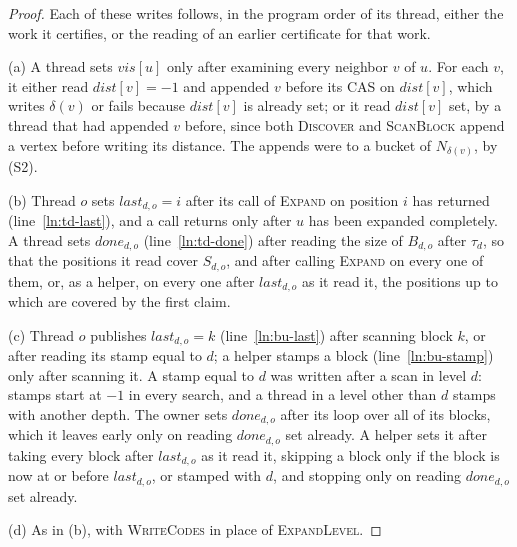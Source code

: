 \begin{proof}
Each of these writes follows, in the program order of its thread, either the work it certifies, or the reading of an earlier certificate for that work.

(a) A thread sets $\mathit{vis}[u]$ only after examining every neighbor $v$ of $u$. For each $v$, it either read $\mathit{dist}[v] = -1$ and appended $v$ before its CAS on $\mathit{dist}[v]$, which writes $\delta(v)$ or fails because $\mathit{dist}[v]$ is already set; or it read $\mathit{dist}[v]$ set, by a thread that had appended $v$ before, since both \textsc{Discover} and \textsc{ScanBlock} append a vertex before writing its distance. The appends were to a bucket of $N_{\delta(v)}$, by (S2).

(b) Thread $o$ sets $\mathit{last}_{d,o} = i$ after its call of \textsc{Expand} on position $i$ has returned (line~\ref{ln:td-last}), and a call returns only after $u$ has been expanded completely. A thread sets $\mathit{done}_{d,o}$ (line~\ref{ln:td-done}) after reading the size of $B_{d,o}$ after $\tau_d$, so that the positions it read cover $S_{d,o}$, and after calling \textsc{Expand} on every one of them, or, as a helper, on every one after $\mathit{last}_{d,o}$ as it read it, the positions up to which are covered by the first claim.

(c) Thread $o$ publishes $\mathit{last}_{d,o} = k$ (line~\ref{ln:bu-last}) after scanning block $k$, or after reading its stamp equal to $d$; a helper stamps a block (line~\ref{ln:bu-stamp}) only after scanning it. A stamp equal to $d$ was written after a scan in level $d$: stamps start at $-1$ in every search, and a thread in a level other than $d$ stamps with another depth. The owner sets $\mathit{done}_{d,o}$ after its loop over all of its blocks, which it leaves early only on reading $\mathit{done}_{d,o}$ set already. A helper sets it after taking every block after $\mathit{last}_{d,o}$ as it read it, skipping a block only if the block is now at or before $\mathit{last}_{d,o}$, or stamped with $d$, and stopping only on reading $\mathit{done}_{d,o}$ set already.

(d) As in (b), with \textsc{WriteCodes} in place of \textsc{ExpandLevel}.
\end{proof}

